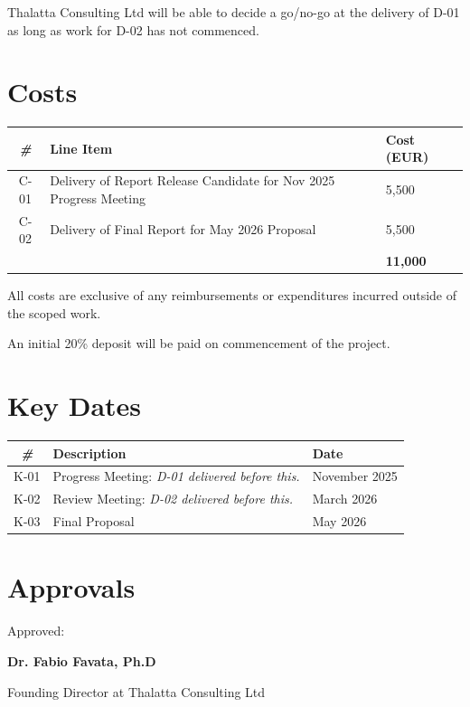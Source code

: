 \documentclass[
	a4paper, %
]{ChaosEngineReport}
\newcommand{\signature}[3]{%
    \vspace{15mm}
    Approved: \hrulefill
    
    \hspace*{0mm}\phantom{Approved: }\textbf{#1}
    
    \hspace*{0mm}\phantom{Approved: }#2 at #3
}
\begin{document}
Thalatta Consulting Ltd will be able to decide a go/no-go at the delivery of D-01 as long as work for D-02 has not commenced.

\section{Costs}

\begin{table}[H]
  \centering
  \begin{tabularx}{\textwidth}{cll}
    \toprule
    \textit{\#} & \textbf{Line Item}  & \textbf{Cost (EUR)} \\
    \toprule
    C-01 & Delivery of Report Release Candidate for Nov 2025 Progress Meeting  & 5,500 \\
    C-02 & Delivery of Final Report for May 2026 Proposal & 5,500 \\
    \bottomrule
    & & \textbf{11,000}\\
  \end{tabularx}
\end{table}
All costs are exclusive of any reimbursements or expenditures incurred outside of the scoped work.

An initial 20\% deposit will be paid on commencement of the project.
\section{Key Dates}

\begin{table}[H]
  \centering
  \begin{tabularx}{\textwidth}{cll}
    \toprule
    \textit{\#} & \textbf{Description}  & \textbf{Date} \\
    \toprule
    K-01 & Progress Meeting: \textit{D-01 delivered before this.}  &  November 2025 \\
    K-02 & Review Meeting: \textit{D-02 delivered before this.}  &  March 2026 \\
    K-03 & Final Proposal &  May 2026 \\
  \end{tabularx}
\end{table}

\newpage
\section{Approvals}

\signature{Dr. Fabio Favata, Ph.D}{Founding Director}{Thalatta Consulting Ltd}
\end{document}
